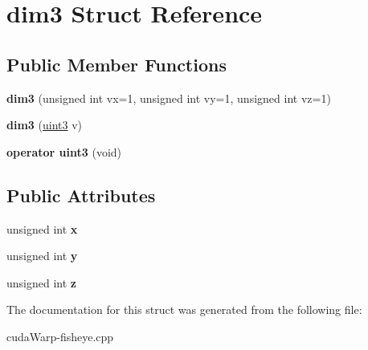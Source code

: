\hypertarget{structdim3}{}\section{dim3 Struct Reference}
\label{structdim3}
\subsection*{Public Member Functions}
\begin{DoxyCompactItemize}
\item 
{\bfseries dim3} (unsigned int vx=1, unsigned int vy=1, unsigned int vz=1)\hypertarget{structdim3_a04c0006feb0d703a48f4910fcaacd7cc}{}\label{structdim3_a04c0006feb0d703a48f4910fcaacd7cc}

\item 
{\bfseries dim3} (\hyperlink{structuint3}{uint3} v)\hypertarget{structdim3_aa317365e9eae4f45a182d7e2cde73b19}{}\label{structdim3_aa317365e9eae4f45a182d7e2cde73b19}

\item 
{\bfseries operator uint3} (void)\hypertarget{structdim3_a2c3b541bc50777d815d9e9633fe69e2c}{}\label{structdim3_a2c3b541bc50777d815d9e9633fe69e2c}

\end{DoxyCompactItemize}
\subsection*{Public Attributes}
\begin{DoxyCompactItemize}
\item 
unsigned int {\bfseries x}\hypertarget{structdim3_ac94584074d5c15f67c66656859bb24e9}{}\label{structdim3_ac94584074d5c15f67c66656859bb24e9}

\item 
unsigned int {\bfseries y}\hypertarget{structdim3_ae87d6f5fc0cc038be953f78f36ba873f}{}\label{structdim3_ae87d6f5fc0cc038be953f78f36ba873f}

\item 
unsigned int {\bfseries z}\hypertarget{structdim3_a4856dbf9372e82eb478bf14ec1d2e294}{}\label{structdim3_a4856dbf9372e82eb478bf14ec1d2e294}

\end{DoxyCompactItemize}


The documentation for this struct was generated from the following file\+:\begin{DoxyCompactItemize}
\item 
cuda\+Warp-\/fisheye.\+cpp\end{DoxyCompactItemize}
